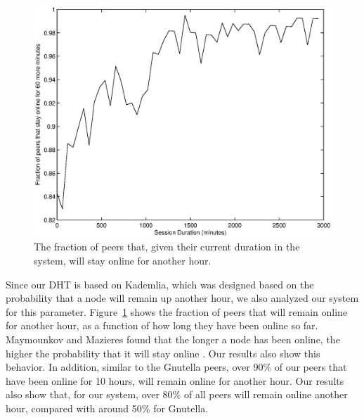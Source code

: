 \documentclass[conference]{IEEEtran}
\begin{document}
% 

\begin{figure}
\centering
\includegraphics[width=0.80\columnwidth]{AptP2PDuration-online_1.eps}
\caption{The fraction of peers that, given their current duration in
the system, will stay online for another hour.}
\label{duration_online_1}
\end{figure}

Since our DHT is based on Kademlia, which was designed based on the
probability that a node will remain up another hour, we also
analyzed our system for this parameter.
Figure~\ref{duration_online_1} shows the fraction of peers that will
remain online for another hour, as a function of how long they have
been online so far. Maymounkov and Mazieres found that the longer a
node has been online, the higher the probability that it will stay
online \cite{kademlia}. Our results also show this behavior. In
addition, similar to the Gnutella peers, over 90\% of our peers that
have been online for 10 hours, will remain online for another hour.
Our results also show that, for our system, over 80\% of all peers
will remain online another hour, compared with around 50\% for
Gnutella.
\end{document}
